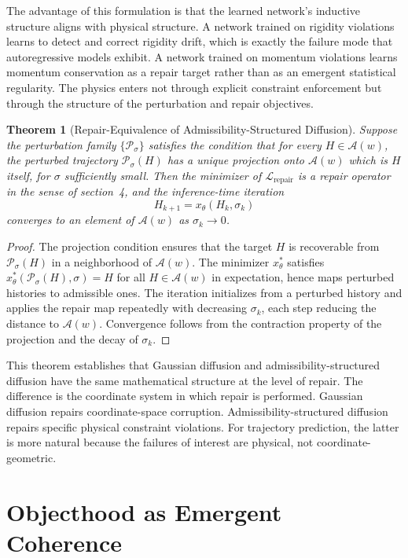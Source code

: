 \documentclass[12pt,oneside]{article}
\newtheorem{theorem}{Theorem}[section]
\theoremstyle{definition}
\newcommand{\A}{\mathcal{A}}
\begin{document}
The advantage of this formulation is that the learned network's inductive structure
aligns with physical structure. A network trained on rigidity violations learns
to detect and correct rigidity drift, which is exactly the failure mode that
autoregressive models exhibit. A network trained on momentum violations learns
momentum conservation as a repair target rather than as an emergent statistical
regularity. The physics enters not through explicit constraint enforcement but
through the structure of the perturbation and repair objectives.

\begin{theorem}[Repair-Equivalence of Admissibility-Structured Diffusion]
Suppose the perturbation family \(\{\mathcal{P}_\sigma\}\) satisfies the condition
that for every \(H \in \A(w)\), the perturbed trajectory \(\mathcal{P}_\sigma(H)\)
has a unique projection onto \(\A(w)\) which is \(H\) itself, for \(\sigma\)
sufficiently small. Then the minimizer of \(\mathcal{L}_{\text{repair}}\) is a
repair operator in the sense of section~4, and the inference-time iteration
\[
H_{k+1} = x_\theta(H_k, \sigma_k)
\]
converges to an element of \(\A(w)\) as \(\sigma_k \to 0\).
\end{theorem}

\begin{proof}
The projection condition ensures that the target \(H\) is recoverable from
\(\mathcal{P}_\sigma(H)\) in a neighborhood of \(\A(w)\). The minimizer
\(x_\theta^*\) satisfies \(x_\theta^*(\mathcal{P}_\sigma(H), \sigma) = H\)
for all \(H \in \A(w)\) in expectation, hence maps perturbed histories to
admissible ones. The iteration initializes from a perturbed history and
applies the repair map repeatedly with decreasing \(\sigma_k\), each step
reducing the distance to \(\A(w)\). Convergence follows from the contraction
property of the projection and the decay of \(\sigma_k\).
\end{proof}

This theorem establishes that Gaussian diffusion and admissibility-structured
diffusion have the same mathematical structure at the level of repair. The
difference is the coordinate system in which repair is performed. Gaussian
diffusion repairs coordinate-space corruption. Admissibility-structured diffusion
repairs specific physical constraint violations. For trajectory prediction, the
latter is more natural because the failures of interest are physical, not
coordinate-geometric.

\section{Objecthood as Emergent Coherence}
\end{document}
